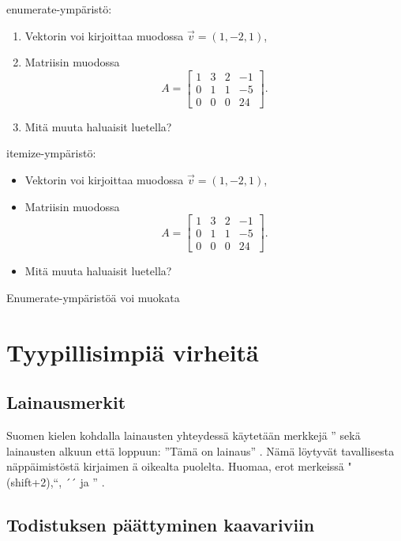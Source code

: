 \documentclass[a4paper,12 pt]{article}
\theoremstyle{plain}
\theoremstyle{definition}
\theoremstyle{remark}
\numberwithin{equation}{section}
\numberwithin{figure}{section}
\begin{document}
\noindent enumerate-ympäristö:

\begin{enumerate}[label=\alph*)]

\item \label{eka1} Vektorin voi kirjoittaa muodossa $\vec{v}=(1,-2,1)$,

\item Matriisin muodossa 
\[
A=\begin{bmatrix}
1 & 3 & 2 & -1 \\
0 & 1 & 1 & -5 \\
0 & 0 & 0 & 24 
\end{bmatrix}.
\]


\item Mitä muuta haluaisit luetella?

\end{enumerate}

\noindent itemize-ympäristö:

\begin{itemize}

\item \label{eka} Vektorin voi kirjoittaa muodossa $\vec{v}=(1,-2,1)$,

\item Matriisin muodossa 
\[
A=
\begin{bmatrix}
1 & 3 & 2 & -1 \\
0 & 1 & 1 & -5 \\
0 & 0 & 0 & 24 
\end{bmatrix}.
\]


\item Mitä muuta haluaisit luetella?

\end{itemize}
Enumerate-ympäristöä voi muokata

\section{Tyypillisimpiä virheitä}

\subsection*{Lainausmerkit}

Suomen kielen kohdalla lainausten yhteydessä käytetään merkkejä '' sekä lainausten alkuun että loppuun: ''Tämä on lainaus'' . Nämä löytyvät tavallisesta näppäimistöstä kirjaimen ä oikealta puolelta. Huomaa, erot merkeissä " (shift+2),``, ´´ ja '' .

\subsection*{Todistuksen päättyminen kaavariviin}
\end{document}

